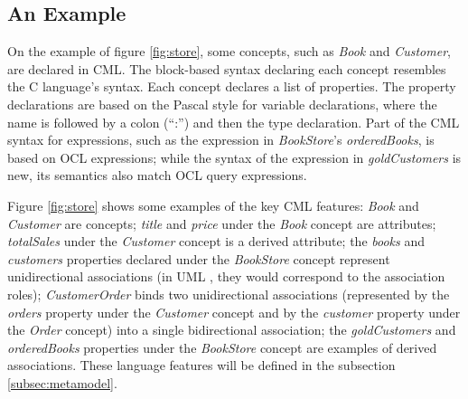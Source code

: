 \subsection{An Example}\label{subsec:example}

On the example of figure \ref{fig:store}, some concepts, such as \emph{Book} and \emph{Customer}, are declared in CML.
The block-based syntax declaring each concept resembles the C \cite{clang} language's syntax.
Each concept declares a list of properties.
The property declarations are based on the Pascal \cite{pascal} style for variable declarations,
where the name is followed by a colon (``:'') and then the type declaration.
Part of the CML syntax for expressions, such as the expression in \emph{BookStore}'s \emph{orderedBooks}, is based on OCL \cite{ocl} expressions; while the syntax of the expression in \emph{goldCustomers} is new, its semantics also match OCL \cite{ocl} query expressions.



Figure \ref{fig:store} shows some examples of the key CML features:
\emph{Book} and \emph{Customer} are concepts;
\emph{title} and \emph{price} under the \emph{Book} concept are attributes;
\emph{totalSales} under the \emph{Customer} concept is a derived attribute;
the \emph{books} and \emph{customers} properties declared under the \emph{BookStore} concept represent unidirectional associations (in UML \cite{uml}, they would correspond to the association roles);
\emph{CustomerOrder} binds two unidirectional associations
(represented by the \emph{orders} property under the \emph{Customer} concept
and by the \emph{customer} property under the \emph{Order} concept)
into a single bidirectional association;
the \emph{goldCustomers} and \emph{orderedBooks} properties under the \emph{BookStore} concept are examples of derived associations. These language features will be defined in the subsection \ref{subsec:metamodel}.
